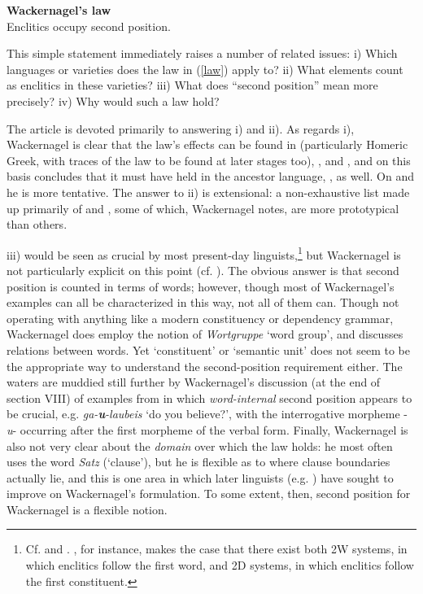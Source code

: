 \begin{exe}
\ex\label{law} \textbf{Wackernagel's law}\\
Enclitics occupy second position.
\end{exe}

This simple statement immediately raises a number of related issues: i) Which languages or varieties does the law in (\ref{law}) apply to? ii) What elements count as enclitics in these varieties? iii) What does ``second position'' mean more precisely? iv) Why would such a law hold?

The article is devoted primarily to answering i) and ii). As regards i), Wackernagel is clear that the law's effects can be found in  (particularly Homeric Greek, with traces of the law to be found at later stages too), , and , and on this basis concludes that it must have held in the ancestor language, , as well. On  and  he is more tentative. The answer to ii) is extensional: a non-exhaustive list made up primarily of  and , some of which, Wackernagel notes, are more prototypical than others.

iii) would be seen as crucial by most present-day linguists,\footnote{Cf. \citet[18--20]{Zwicky1977} and \citet[72--73]{Anderson1993}. \citet{Halpern1995}, for instance, makes the case that there exist both 2W systems, in which enclitics follow the first word, and 2D systems, in which enclitics follow the first constituent.} but Wackernagel is not particularly explicit on this point (cf. \citealp[11]{AzizHanna2015}). The obvious answer is that second position is counted in terms of words; however, though most of Wackernagel's examples can all be characterized in this way, not all of them can. Though not operating with anything like a modern constituency or dependency grammar, Wackernagel does employ the notion of \textit{Wortgruppe} `word group', and discusses relations between words. Yet `constituent' or `semantic unit' does not seem to be the appropriate way to understand the second-position requirement either. The waters are muddied still further by Wackernagel's discussion (at the end of section VIII) of examples from  in which \textit{word-internal} second position appears to be crucial, e.g.  \textit{ga-\textbf{u}-laubeis} `do you believe?', with the interrogative morpheme -\textit{u}- occurring after the first morpheme of the verbal form. Finally, Wackernagel is also not very clear about the \emph{domain} over which the law holds: he most often uses the word \emph{Satz} (`clause'), but he is flexible as to where clause boundaries actually lie, and this is one area in which later linguists (e.g. \citealp{Fraenkel1932,Fraenkel1933,Fraenkel1965,Ruijgh1990}) have sought to improve on Wackernagel's formulation. To some extent, then, second position for Wackernagel is a flexible notion.

